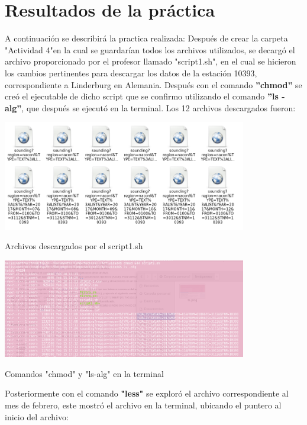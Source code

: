 \documentclass{article}
\begin{document}
\section{Resultados de la práctica}
A continuación se describirá la practica realizada:
Después de crear la carpeta "Actividad 4"en la cual se guardarían todos los archivos utilizados, se decargó el archivo proporcionado por el profesor llamado "script1.sh", en el cual se hicieron los cambios pertinentes para descargar los datos de la estación 10393, correspondiente a Linderburg en Alemania. Después con el comando \textbf{''chmod''} se creó el ejecutable de dicho script que se confirmo utilizando el comando \textbf{''ls -alg''}, que después se ejecutó en la terminal. Los 12 archivos descargados fueron:
\begin{center}
 \includegraphics[width=0.8\textwidth]{archivosdescargados.png}

 Archivos descargados por el script1.sh
\end{center}

\begin{center}
  \includegraphics[width=0.8\textwidth]{chmod.png}

Comandos "chmod" y "ls-alg" en la terminal

\end{center}

Posteriormente con el comando \textbf{"less"} se exploró el archivo correspondiente al mes de febrero, este mostró el archivo en la terminal, ubicando el puntero al inicio del archivo:
\end{document}

